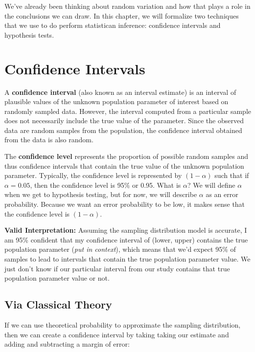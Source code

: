 \documentclass[]{book}
\begin{document}
We've already been thinking about random variation and how that plays a role in the conclusions we can draw. In this chapter, we will formalize two techniques that we use to do perform statistican inference: confidence intervals and hypothesis tests.

\hypertarget{confidence-intervals}{%
\section{Confidence Intervals}\label{confidence-intervals}}

A \textbf{confidence interval} (also known as an interval estimate) is an interval of plausible values of the unknown population parameter of interest based on randomly sampled data. However, the interval computed from a particular sample does not necessarily include the true value of the parameter. Since the observed data are random samples from the population, the confidence interval obtained from the data is also random.

The \textbf{confidence level} represents the proportion of possible random samples and thus confidence intervals that contain the true value of the unknown population parameter. Typically, the confidence level is represented by \((1-\alpha)\) such that if \(\alpha = 0.05\), then the confidence level is 95\% or 0.95. What is \(\alpha\)? We will define \(\alpha\) when we get to hypothesis testing, but for now, we will describe \(\alpha\) as an error probability. Because we want an error probability to be low, it makes sense that the confidence level is \((1-\alpha)\).

\textbf{Valid Interpretation:} Assuming the sampling distribution model is accurate, I am 95\% confident that my confidence interval of (lower, upper) contains the true population parameter (\emph{put in context}), which means that we'd expect 95\% of samples to lead to intervals that contain the true population parameter value. We just don't know if our particular interval from our study contains that true population parameter value or not.

\hypertarget{via-classical-theory}{%
\subsection{Via Classical Theory}\label{via-classical-theory}}

If we can use theoretical probability to approximate the sampling distribution, then we can create a confidence interval by taking taking our estimate and adding and subtracting a margin of error:
\end{document}
